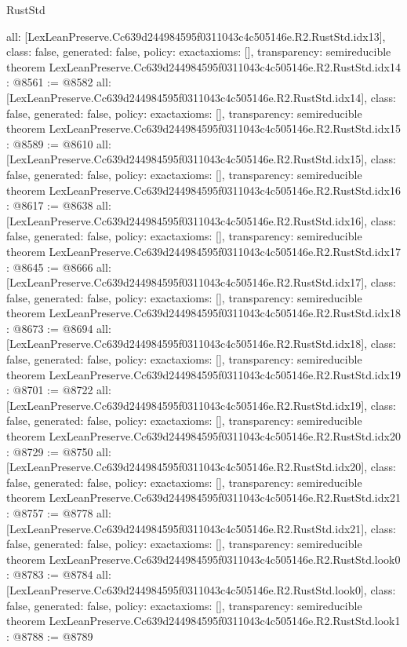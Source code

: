 \begin{lexlean}{RustStd}
\begin{coremodule}
{  all: [LexLeanPreserve.Cc639d244984595f0311043c4c505146e.R2.RustStd.idx13],
  class: false,
  generated: false,
  policy: exact{axioms: []},
  transparency: semireducible
}
theorem LexLeanPreserve.Cc639d244984595f0311043c4c505146e.R2.RustStd.idx14 : @8561 := @8582 {
  all: [LexLeanPreserve.Cc639d244984595f0311043c4c505146e.R2.RustStd.idx14],
  class: false,
  generated: false,
  policy: exact{axioms: []},
  transparency: semireducible
}
theorem LexLeanPreserve.Cc639d244984595f0311043c4c505146e.R2.RustStd.idx15 : @8589 := @8610 {
  all: [LexLeanPreserve.Cc639d244984595f0311043c4c505146e.R2.RustStd.idx15],
  class: false,
  generated: false,
  policy: exact{axioms: []},
  transparency: semireducible
}
theorem LexLeanPreserve.Cc639d244984595f0311043c4c505146e.R2.RustStd.idx16 : @8617 := @8638 {
  all: [LexLeanPreserve.Cc639d244984595f0311043c4c505146e.R2.RustStd.idx16],
  class: false,
  generated: false,
  policy: exact{axioms: []},
  transparency: semireducible
}
theorem LexLeanPreserve.Cc639d244984595f0311043c4c505146e.R2.RustStd.idx17 : @8645 := @8666 {
  all: [LexLeanPreserve.Cc639d244984595f0311043c4c505146e.R2.RustStd.idx17],
  class: false,
  generated: false,
  policy: exact{axioms: []},
  transparency: semireducible
}
theorem LexLeanPreserve.Cc639d244984595f0311043c4c505146e.R2.RustStd.idx18 : @8673 := @8694 {
  all: [LexLeanPreserve.Cc639d244984595f0311043c4c505146e.R2.RustStd.idx18],
  class: false,
  generated: false,
  policy: exact{axioms: []},
  transparency: semireducible
}
theorem LexLeanPreserve.Cc639d244984595f0311043c4c505146e.R2.RustStd.idx19 : @8701 := @8722 {
  all: [LexLeanPreserve.Cc639d244984595f0311043c4c505146e.R2.RustStd.idx19],
  class: false,
  generated: false,
  policy: exact{axioms: []},
  transparency: semireducible
}
theorem LexLeanPreserve.Cc639d244984595f0311043c4c505146e.R2.RustStd.idx20 : @8729 := @8750 {
  all: [LexLeanPreserve.Cc639d244984595f0311043c4c505146e.R2.RustStd.idx20],
  class: false,
  generated: false,
  policy: exact{axioms: []},
  transparency: semireducible
}
theorem LexLeanPreserve.Cc639d244984595f0311043c4c505146e.R2.RustStd.idx21 : @8757 := @8778 {
  all: [LexLeanPreserve.Cc639d244984595f0311043c4c505146e.R2.RustStd.idx21],
  class: false,
  generated: false,
  policy: exact{axioms: []},
  transparency: semireducible
}
theorem LexLeanPreserve.Cc639d244984595f0311043c4c505146e.R2.RustStd.look0 : @8783 := @8784 {
  all: [LexLeanPreserve.Cc639d244984595f0311043c4c505146e.R2.RustStd.look0],
  class: false,
  generated: false,
  policy: exact{axioms: []},
  transparency: semireducible
}
theorem LexLeanPreserve.Cc639d244984595f0311043c4c505146e.R2.RustStd.look1 : @8788 := @8789 {
}
\end{coremodule}
\end{lexlean}
